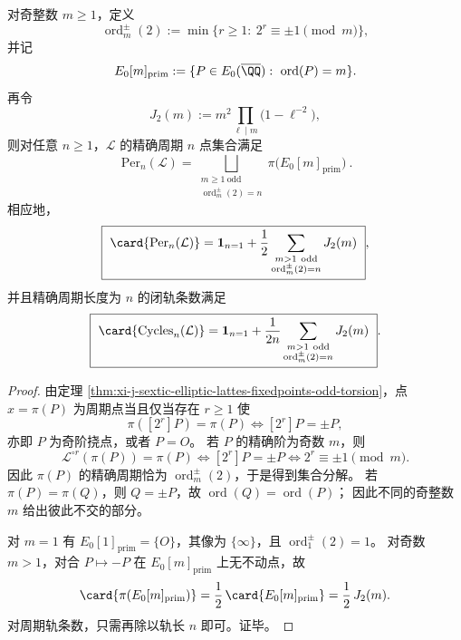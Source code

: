 \begin{corollary}\label{cor:xi-j-sextic-elliptic-lattes-exact-periodic-jordan}
对奇整数 \(m\ge 1\)，定义
\[
\operatorname{ord}_m^{\pm}(2):=\min\{r\ge 1:\ 2^r\equiv \pm1\pmod m\},
\]
并记
\[
E_0[m]_{\mathrm{prim}}
:=\{P\in E_0(\overline{\QQ}):\ \operatorname{ord}(P)=m\}.
\]
再令
\[
J_2(m):=m^2\prod_{\ell\mid m}\bigl(1-\ell^{-2}\bigr),
\]
则对任意 \(n\ge 1\)，\(\mathcal L\) 的精确周期 \(n\) 点集合满足
\[
\boxed{\ 
\mathrm{Per}_n(\mathcal L)
=\bigsqcup_{\substack{m\ge 1\ \mathrm{odd}\\ \operatorname{ord}_m^{\pm}(2)=n}}
\pi\bigl(E_0[m]_{\mathrm{prim}}\bigr)\ }.
\]
相应地，
\[
\boxed{\ 
\card{\mathrm{Per}_n(\mathcal L)}
=\mathbf 1_{n=1}
+\frac12\sum_{\substack{m>1\ \mathrm{odd}\\ \operatorname{ord}_m^{\pm}(2)=n}}J_2(m)\ },
\]
并且精确周期长度为 \(n\) 的闭轨条数满足
\[
\boxed{\ 
\card{\mathrm{Cycles}_n(\mathcal L)}
=\mathbf 1_{n=1}
+\frac1{2n}\sum_{\substack{m>1\ \mathrm{odd}\\ \operatorname{ord}_m^{\pm}(2)=n}}J_2(m)\ }.
\]
\end{corollary}
\begin{proof}
由定理 \ref{thm:xi-j-sextic-elliptic-lattes-fixedpoints-odd-torsion}，点 \(x=\pi(P)\) 为周期点当且仅当存在 \(r\ge 1\) 使
\[
\pi([2^r]P)=\pi(P)
\iff
[2^r]P=\pm P,
\]
亦即 \(P\) 为奇阶挠点，或者 \(P=O\)。
若 \(P\) 的精确阶为奇数 \(m\)，则
\[
\mathcal L^{\circ r}(\pi(P))=\pi(P)
\iff
[2^r]P=\pm P
\iff
2^r\equiv \pm1\pmod m.
\]
因此 \(\pi(P)\) 的精确周期恰为 \(\operatorname{ord}_m^{\pm}(2)\)，于是得到集合分解。
若 \(\pi(P)=\pi(Q)\)，则 \(Q=\pm P\)，故 \(\operatorname{ord}(Q)=\operatorname{ord}(P)\)；
因此不同的奇整数 \(m\) 给出彼此不交的部分。
\par
对 \(m=1\) 有 \(E_0[1]_{\mathrm{prim}}=\{O\}\)，其像为 \(\{\infty\}\)，且 \(\operatorname{ord}_1^{\pm}(2)=1\)。
对奇数 \(m>1\)，对合 \(P\mapsto -P\) 在 \(E_0[m]_{\mathrm{prim}}\) 上无不动点，故
\[
\card{\pi(E_0[m]_{\mathrm{prim}})}=\frac12\,\card{E_0[m]_{\mathrm{prim}}}
=\frac12\,J_2(m).
\]
对周期轨条数，只需再除以轨长 \(n\) 即可。证毕。
\end{proof}

